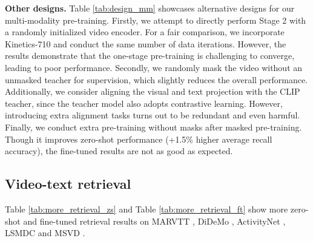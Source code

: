 \documentclass[10pt,twocolumn,letterpaper]{article}
\begin{document}
\textbf{Other designs.}
Table \ref{tab:design_mm} showcases alternative designs for our multi-modality pre-training.
Firstly, 
we attempt to directly perform Stage 2 with a randomly initialized video encoder. 
For a fair comparison, 
we incorporate Kinetics-710 and conduct the same number of data iterations. 
However, 
the results demonstrate that the one-stage pre-training is challenging to converge, 
leading to poor performance. 
Secondly,
we randomly mask the video without an unmasked teacher for supervision,
which slightly reduces the overall performance. 
Additionally, 
we consider aligning the visual and text projection with the CLIP teacher,
since the teacher model also adopts contrastive learning. 
However, 
introducing extra alignment tasks turns out to be redundant and even harmful. 
Finally, 
we conduct extra pre-training without masks after masked pre-training.
Though it improves zero-shot performance (+1.5\% higher average recall accuracy),
the fine-tuned results are not as good as expected.

\subsection{Video-text retrieval}
Table \ref{tab:more_retrieval_zs} and Table \ref{tab:more_retrieval_ft} show more zero-shot and fine-tuned retrieval results on MARVTT \cite{msrvtt}, DiDeMo \cite{didemo}, ActivityNet \cite{anet}, LSMDC \cite{lsmdc} and MSVD \cite{msvd}.
\end{document}
